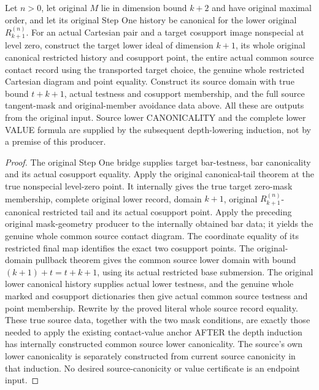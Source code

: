 \begin{theorem}
\label{hir:smooth-original-zero-contact-canonical-lower-diagram}
\leanok
{}
Let $n>0$, let original $M$ lie in dimension bound $k+2$ and have original
maximal order, and let its original Step One history be canonical for
the lower original $R^{(n)}_{k+1}$. For an actual Cartesian pair and a
target cosupport image nonspecial at level zero, construct the target
lower ideal of dimension $k+1$, its whole original canonical restricted
history and cosupport point, the entire actual common source contact
record using the transported target choice, the genuine whole restricted
Cartesian diagram and point equality. Construct its source domain with
true bound $t+k+1$, actual testness and cosupport membership, and the
full source tangent-mask and original-member avoidance data above.
All these are outputs from the original input. Source lower CANONICALITY
and the complete lower VALUE formula are supplied by the subsequent
depth-lowering induction, not by a premise of this producer.
\end{theorem}
\begin{proof}
The original Step One bridge supplies target bar-testness, bar canonicality
and its actual cosupport equality. Apply the original canonical-tail
theorem at the true nonspecial level-zero point. It internally gives the
true target zero-mask membership, complete original lower record, domain
$k+1$, original $R^{(n)}_{k+1}$-canonical restricted tail and its actual
cosupport point. Apply the preceding original mask-geometry producer to
the internally obtained bar data; it yields the genuine whole common
source contact diagram. The coordinate equality of its restricted final
map identifies the exact two cosupport points. The original-domain
pullback theorem gives the common source lower domain with bound
$(k+1)+t=t+k+1$, using its actual restricted base submersion. The original
lower canonical history supplies actual lower testness, and the genuine
whole marked and cosupport dictionaries then give actual common source
testness and point membership. Rewrite by the proved literal whole source
record equality. These true source data, together with the two mask
conditions, are exactly those needed to apply the existing contact-value
anchor AFTER the depth induction has internally constructed common
source lower canonicality. The source's own lower canonicality is
separately constructed from current source canonicity in that induction.
No desired source-canonicity or value certificate is an endpoint input.
\end{proof}
